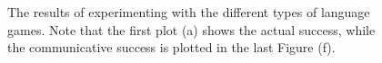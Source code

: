 \begin{figure}[t]
\centering
{}
\caption{The results of experimenting with the different types of language games. Note that the first plot (a) shows the actual success, while the communicative success is plotted in the last Figure (f).}
\label{f:par:feedback}
\end{figure}


